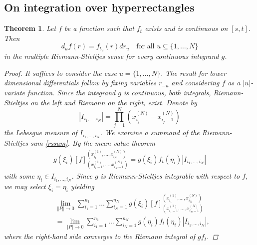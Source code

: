 \documentclass[english, a4paper, 12pt,reqno]{amsart}
\newtheorem{theorem}[defi]{Theorem}
\begin{document}
\subsection{On integration over  hyperrectangles}
\label{subsec:RS-standard}
\begin{theorem}
\label{lemma:radon}
Let $f$ be a function such that $f_t$ exists and is continuous on $[s,t]$. Then
$$d_u f(r) = f_{t_u}(r)dr_u\quad \text{for all } u\subseteq\{1,\dots,N\}$$
in the multiple Riemann-Stieltjes sense for every continuous integrand $g$. 
\begin{proof}
It suffices to consider the case $u = \{1,\dots,N\}$. The result for lower dimensional differentials follow by fixing variables $r_{-u}$ and considering $f$ as a $|u|$-variate function. Since the integrand $g$ is continuous, both integrals, Riemann-Stieltjes on the left and Riemann on the right, exist. Denote by
$$\left|I_{i_1,\dots,i_N}\right| = \prod_{j=1}^N (x_{i_j}^{(N)} -x_{i_j-1}^{(N)}) $$
the Lebesgue measure of $I_{i_1,\dots,i_N}$. We examine a summand of the Riemann-Stieltjes sum \eqref{rssum}. By the mean value theorem
\begin{equation*}
\begin{split}
 g(\xi_i)[f]_{(x^{(1)}_{i_1-1}, \dots, x^{(N)}_{i_N-1})}^{(x^{(1)}_{i_1}, \dots, x^{(N)}_{i_N})} =
 g(\xi_i) f_{t}(\eta_{i})\left|I_{i_1,\dots,i_N}\right|
 \end{split}
\end{equation*}
with some $\eta_{i}\in I_{i_1,\dots,i_N}$. 
Since $g$ is Riemann-Stieltjes integrable with respect to $f$, we may select $\xi_i = \eta_{i}$
yielding
\begin{equation*}
\begin{split}
&\lim_{\Vert P \Vert\to 0} \sum_{i_1 = 1}^{n_1}\dots\sum_{i_N = 1}^{n_N}g(\xi_i)[f]_{(x^{(1)}_{i_1-1}, \dots, x^{(N)}_{i_N-1})}^{(x^{(1)}_{i_1}, \dots, x^{(N)}_{i_N})}\\
&= \lim_{\Vert P \Vert\to 0}\sum_{i_1 = 1}^{n_1}\dots\sum_{i_N = 1}^{n_N} g(\eta_i) f_{t}(\eta_i)\left|I_{i_1,\dots,i_N}\right|,
\end{split}
\end{equation*}
where the right-hand side converges to the Riemann integral of $gf_t$.
\end{proof}
\end{theorem}
\end{document}

